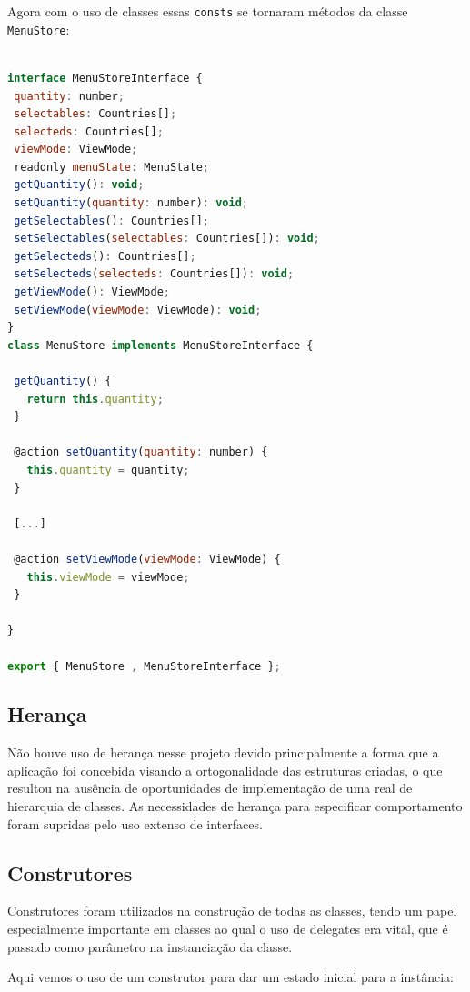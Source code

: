 \documentclass[rel_mlp]{iiufrgs}
\begin{document}
Agora com o uso de classes essas \verb|consts| se tornaram métodos da classe \verb|MenuStore|:

\begin{lstlisting}[language=JavaScript]

interface MenuStoreInterface {
 quantity: number;
 selectables: Countries[];
 selecteds: Countries[];
 viewMode: ViewMode;
 readonly menuState: MenuState;
 getQuantity(): void;
 setQuantity(quantity: number): void;
 getSelectables(): Countries[];
 setSelectables(selectables: Countries[]): void;
 getSelecteds(): Countries[];
 setSelecteds(selecteds: Countries[]): void;
 getViewMode(): ViewMode;
 setViewMode(viewMode: ViewMode): void;
}
class MenuStore implements MenuStoreInterface {

 getQuantity() {
   return this.quantity;
 }

 @action setQuantity(quantity: number) {
   this.quantity = quantity;
 }

 [...]

 @action setViewMode(viewMode: ViewMode) {
   this.viewMode = viewMode;
 }

}

export { MenuStore , MenuStoreInterface };

\end{lstlisting}

\subsection{Herança}

Não houve uso de herança nesse projeto devido principalmente a forma que a aplicação foi concebida visando a ortogonalidade das estruturas criadas, o que resultou na ausência de oportunidades de implementação
de uma real de hierarquia de classes. As necessidades de herança para especificar comportamento foram supridas pelo uso extenso de interfaces.

\subsection{Construtores}

Construtores foram utilizados na construção de todas as classes, tendo um papel especialmente importante em classes ao qual o uso de delegates era vital, que é passado como parâmetro
na instanciação da classe.

\par

Aqui vemos o uso de um construtor para dar um estado inicial para a instância:
\end{document}
